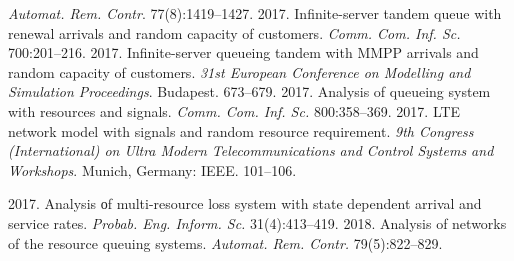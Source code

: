 \begin{multicols}{2}
{{\begin{thebibliography}{99}
\textit{Automat. Rem. Contr}. 77(8):1419--1427.
2017. Infinite-server tandem queue with renewal arrivals and random capacity 
of customers. \textit{Comm. Com. Inf. Sc.} 700:201--216.
 2017. 
Infinite-server queueing tandem with MMPP arrivals and random capacity of customers. 
\textit{31st European Conference on Modelling and Simulation Proceedings}. 
Budapest. 673--679.
 2017. Analysis of queueing system 
with resources and signals. 
\textit{Comm. Com. Inf. Sc.} 800:358--369.
 2017. LTE network model with 
signals and random resource requirement. 
\textit{9th  Congress (International) on Ultra Modern Telecommunications and Control 
Systems and Workshops}. Munich, Germany: IEEE. 101--106.

 2017. Analysis оf multi-resource loss 
system with state dependent arrival and service rates. 
\textit{Probab.  Eng. Inform. Sc.} 31(4):413--419.
 2018. 
Analysis of networks of the resource queuing systems. 
\textit{Automat. Rem. Contr.} 79(5):822--829.


\end{thebibliography}}}
\end{multicols}
